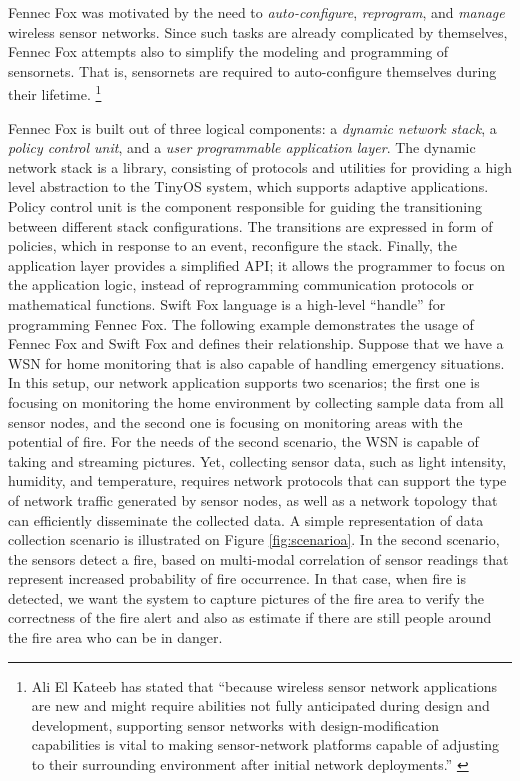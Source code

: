 \documentclass[11pt]{article}
\begin{document}
Fennec Fox was motivated by the need to \textit{auto-configure},
\textit{reprogram}, and \textit{manage} wireless sensor networks. Since
such tasks are already complicated by themselves, Fennec Fox attempts also
to simplify the modeling and programming of sensornets. That is,
sensornets are required to auto-configure themselves during their lifetime.
\footnote{Ali El Kateeb has stated that ``because wireless sensor network
applications are new and might require abilities not fully anticipated
during design and development, supporting sensor networks with
design-modification capabilities is vital to making sensor-network
platforms capable of adjusting to their surrounding environment after
initial network deployments.'' \cite{kateeb:2009}}

Fennec Fox is built out of three logical components: 
a \textit{dynamic network stack}, a \textit{policy control unit}, and a
\textit{user programmable application layer}. The dynamic network stack is
a library, consisting of protocols and utilities for providing a high
level abstraction to the TinyOS \cite{hill:2000} system, which supports
adaptive applications. Policy control unit is the component responsible
for guiding the transitioning between different stack configurations. 
The transitions are expressed in form of policies, which in response to an
event, reconfigure the stack. Finally, the application layer provides a
simplified API; it allows the programmer to focus on the application logic,
instead of reprogramming communication protocols or mathematical functions.
Swift Fox language is a high-level ``handle'' for programming Fennec Fox.
The following example demonstrates the usage of Fennec Fox and Swift Fox
and defines their relationship. Suppose that we have a WSN for home
monitoring that is also capable of handling emergency situations. In this
setup, our network application supports two scenarios; the first one is
focusing on monitoring the home environment by collecting sample data
from all sensor nodes, and the second one is focusing on monitoring areas
with the potential of fire. For the needs of the second scenario, the WSN
is capable of taking and streaming pictures. Yet, collecting sensor data,
such as light intensity, humidity, and temperature, requires network
protocols that can support the type of network traffic generated by sensor 
nodes, as well as a network topology that can efficiently disseminate the
collected data. A simple representation of data collection scenario is
illustrated on Figure \ref{fig:scenarioa}. In the second scenario, the
sensors detect a fire, based on multi-modal correlation of sensor readings
that represent increased probability of fire occurrence. In that case, when
fire is detected, we want the system to capture pictures of the fire area
to verify the correctness of the fire alert and also as estimate if there
are still people around the fire area who can be in danger.
\end{document}
